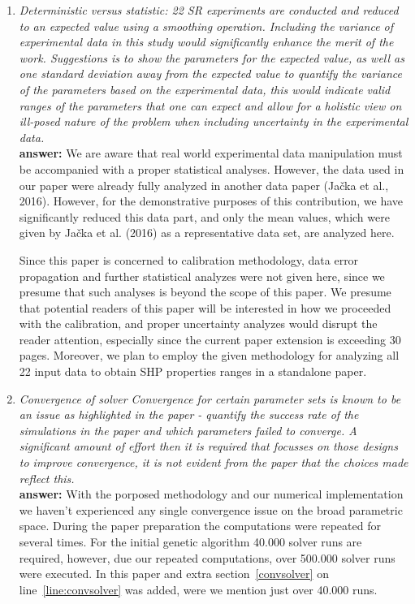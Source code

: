 \documentclass[final,3p, 11pt, a4paper]{elsarticle}
\begin{document}
\begin{enumerate}[label={\bf \Roman*}]
\item {\it Deterministic versus statistic:
 22 SR experiments are conducted and reduced to an expected value using a smoothing operation. Including the variance of experimental data in this study would significantly enhance the merit of the work. Suggestions is to show the parameters for the expected value, as well as one standard deviation away from the expected value to quantify the variance of the parameters based on the experimental data, this would indicate valid ranges of the parameters that one can expect and allow for a holistic view on ill-posed nature of the problem when including uncertainty in the experimental data.}\\
 {\bf answer:} We are aware that real world experimental data manipulation must be accompanied with a proper statistical analyses. However, the data used in our paper were already fully analyzed in another data paper (Ja\v{c}ka et al., 2016). However, for the demonstrative purposes of this contribution, we have significantly reduced this data part, and only the mean values, which were given by Ja\v{c}ka et al. (2016) as a representative data set, are analyzed here. 

Since this paper is concerned to calibration methodology, data error propagation and further statistical analyzes were not given here, since we presume that such analyses is beyond the scope of this paper. We presume that potential readers of this paper will be interested in how we proceeded with the calibration, and proper uncertainty analyzes would disrupt the reader attention, especially since the current paper extension is exceeding 30 pages. Moreover, we plan to employ the given methodology for analyzing all 22 input data to obtain SHP properties ranges in a standalone paper.

\item {\it Convergence of solver
 Convergence for certain parameter sets is known to be an issue as highlighted in the paper - quantify the success rate of the simulations in the paper and which parameters failed to converge. A significant amount of effort then it is required that focusses on those designs to improve convergence, it is not evident from the paper that the choices made reflect this.} \\
 {\bf answer:} With the porposed methodology and our numerical implementation we haven't experienced any single convergence issue on the broad parametric space. During the paper preparation the computations were repeated for several times. For the initial genetic algorithm 40.000 solver runs are required, however, due our repeated computations, over 500.000 solver runs were executed. In this paper and extra section~\ref{convsolver}  on line~\ref{line:convsolver} was added, were we mention just over 40.000 runs. 

\end{enumerate} 
\end{document}
